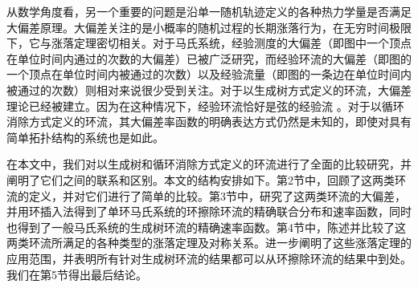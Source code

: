 从数学角度看，另一个重要的问题是沿单一随机轨迹定义的各种热力学量是否满足大偏差原理\cite{varadhan1984large,den2000large}。大偏差关注的是小概率的随机过程的长期涨落行为，在无穷时间极限下，它与涨落定理密切相关。对于马氏系统，经验测度的大偏差（即图中一个顶点在单位时间内通过的次数的大偏差）已被广泛研究，而经验环流的大偏差（即图的一个顶点在单位时间内被通过的次数）以及经验流量（即图的一条边在单位时间内被通过的次数）则相对来说很少受到关注。对于以生成树方式定义的环流，大偏差理论已经被建立。因为在这种情况下，经验环流恰好是弦的经验流 \cite{bertini2015flows,bertini2015large}。对于以循环消除方式定义的环流，其大偏差率函数的明确表达方式仍然是未知的，即使对具有简单拓扑结构的系统也是如此。

在本文中，我们对以生成树和循环消除方式定义的环流进行了全面的比较研究，并阐明了它们之间的联系和区别。本文的结构安排如下。第2节中，回顾了这两类环流的定义，并对它们进行了简单的比较。第3节中，研究了这两类环流的大偏差，并用环插入法得到了单环马氏系统的环擦除环流的精确联合分布和速率函数，同时也得到了一般马氏系统的生成树环流的精确速率函数。第4节中，陈述并比较了这两类环流所满足的各种类型的涨落定理及对称关系。进一步阐明了这些涨落定理的应用范围，并表明所有针对生成树环流的结果都可以从环擦除环流的结果中到处。我们在第5节得出最后结论。